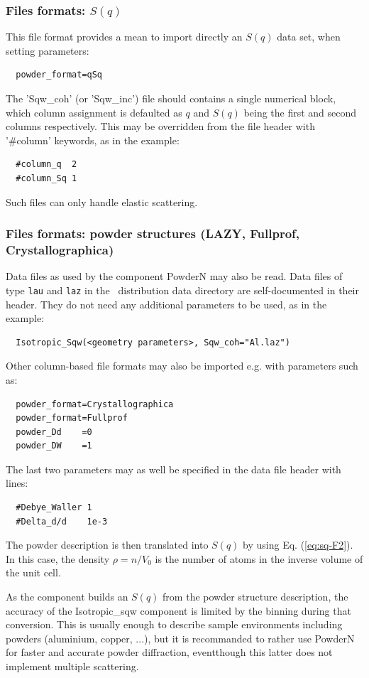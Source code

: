 \subsubsection{Files formats: $S(q)$}

This file format provides a mean to import directly an $S(q)$ data set, when setting parameters:
\begin{verbatim}
  powder_format=qSq
\end{verbatim}
The 'Sqw\_coh' (or 'Sqw\_inc') file should contains a single numerical block, which column assignment is defaulted as $q$ and $S(q)$ being the first and second columns respectively. This may be overridden from the file header with '\#column' keywords, as in the example:
\begin{verbatim}
  #column_q  2
  #column_Sq 1
\end{verbatim}
Such files can only handle elastic scattering.

\subsubsection{Files formats: powder structures (LAZY, Fullprof, Crystallographica)}

Data files as used by the component PowderN may also be read. Data files of type \verb'lau' and \verb'laz' in the \MCS\ distribution data directory are self-documented in their header. They do not need any additional parameters to be used, as in the example:
\begin{verbatim}
  Isotropic_Sqw(<geometry parameters>, Sqw_coh="Al.laz")
\end{verbatim}
Other column-based file formats may also be imported e.g. with parameters such as:
\begin{verbatim}
  powder_format=Crystallographica
  powder_format=Fullprof
  powder_Dd    =0
  powder_DW    =1
\end{verbatim}
The last two parameters may as well be specified in the data file header with lines:
\begin{verbatim}
  #Debye_Waller 1
  #Delta_d/d    1e-3
\end{verbatim}
The powder description is then translated into $S(q)$ by using Eq. (\ref{eq:sq-F2}).
In this case, the density $\rho = n/V_0$ is the number of atoms in the inverse volume of the unit cell.

As the component builds an $S(q)$ from the powder structure description, the accuracy of the Isotropic\_sqw component is limited by the binning during that conversion. This is usually enough to describe sample environments including powders (aluminium, copper, ...), but it is recommanded to rather use PowderN for faster and accurate powder diffraction, eventthough this latter does not implement multiple scattering.

